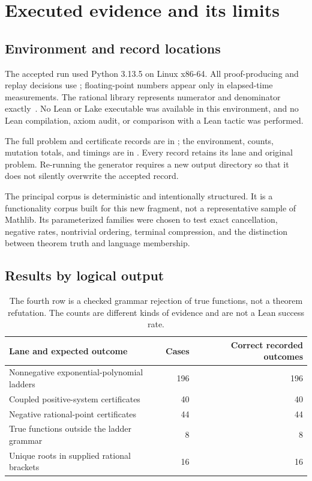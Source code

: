 \section{Executed evidence and its limits}
\label{sec:evidence}

\subsection{Environment and record locations}

The accepted run used Python 3.13.5 on Linux x86-64. All proof-producing and replay decisions use ; floating-point numbers appear only in elapsed-time measurements. The rational library represents numerator and denominator exactly~\cite{fractions}. No Lean or Lake executable was available in this environment, and no Lean compilation, axiom audit, or comparison with a Lean tactic was performed.

The full problem and certificate records are in ; the environment, counts, mutation totals, and timings are in . Every record retains its lane and original problem. Re-running the generator requires a new output directory so that it does not silently overwrite the accepted record.

The principal corpus is deterministic and intentionally structured. It is a functionality corpus built for this new fragment, not a representative sample of Mathlib. Its parameterized families were chosen to test exact cancellation, negative rates, nontrivial ordering, terminal compression, and the distinction between theorem truth and language membership.

\subsection{Results by logical output}

\begin{table}[ht]
\centering
\begin{tabularx}{\textwidth}{@{}Xrr@{}}
\toprule
Lane and expected outcome & Cases & Correct recorded outcomes\\
\midrule
Nonnegative exponential-polynomial ladders & 196 & 196\\
Coupled positive-system certificates & 40 & 40\\
Negative rational-point certificates & 44 & 44\\
True functions outside the ladder grammar & 8 & 8\\
Unique roots in supplied rational brackets & 16 & 16\\
\bottomrule
\end{tabularx}
\caption{The fourth row is a checked grammar rejection of true functions, not a theorem refutation. The counts are different kinds of evidence and are not a Lean success rate.}
\end{table}

